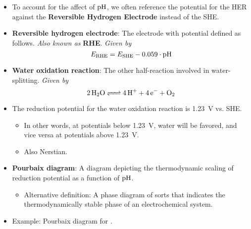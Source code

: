 \documentclass[../notes.tex]{subfiles}
\begin{document}
\begin{itemize}
\begin{itemize}
    \end{itemize}
    \item To account for the affect of $\operatorname{pH}$, we often reference the potential for the HER against the \textbf{Reversible Hydrogen Electrode} instead of the SHE.
    \item \textbf{Reversible hydrogen electrode}: The electrode with potential defined as follows. \emph{Also known as} \textbf{RHE}. \emph{Given by}
    \begin{equation*}
        E_\text{RHE} = E_\text{SHE}-0.059\cdot\operatorname{pH}
    \end{equation*}
    \item \textbf{Water oxidation reaction}: The other half-reaction involved in water-splitting. \emph{Given by}
    \begin{equation*}
        \ce{2H2O <=> 4H+ + 4e^- + O2}
    \end{equation*}
    \item The reduction potential for the water oxidation reaction is \SI{1.23}{\volt} vs. SHE.
    \begin{itemize}
        \item In other words, at potentials below \SI{1.23}{\volt}, water will be favored, and vice versa at potentials above \SI{1.23}{\volt}.
        \item Also Nerstian.
    \end{itemize}
    \item \textbf{Pourbaix diagram}: A diagram depicting the thermodynamic scaling of reduction potential as a function of $\operatorname{pH}$.
    \begin{itemize}
        \item Alternative definition: A phase diagram of sorts that indicates the thermodynamically stable phase of an electrochemical system.
    \end{itemize}
    \item Example: Pourbaix diagram for .
    \begin{figure}[h!]
        \centering
\end{figure}
\end{itemize}
\end{document}
